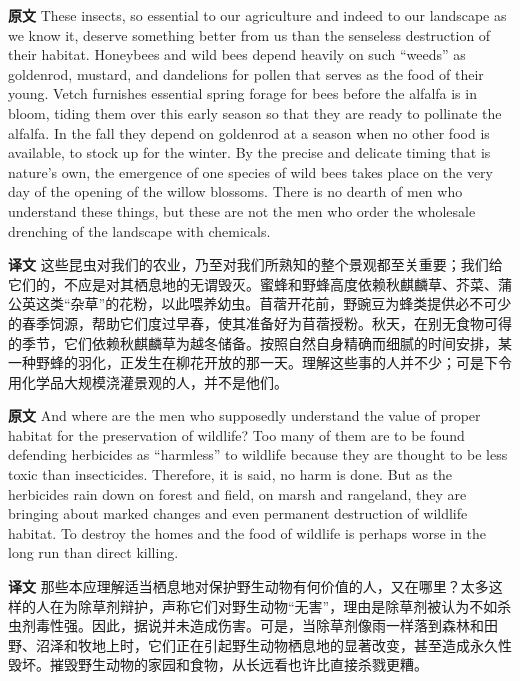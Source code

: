 \documentclass[UTF8,zihao=-4]{ctexart}
\begin{document}
\noindent\textbf{原文} These insects, so essential to our agriculture and indeed to our landscape as we know it, deserve something better from us than the senseless destruction of their habitat. Honeybees and wild bees depend heavily on such ``weeds'' as goldenrod, mustard, and dandelions for pollen that serves as the food of their young. Vetch furnishes essential spring forage for bees before the alfalfa is in bloom, tiding them over this early season so that they are ready to pollinate the alfalfa. In the fall they depend on goldenrod at a season when no other food is available, to stock up for the winter. By the precise and delicate timing that is nature's own, the emergence of one species of wild bees takes place on the very day of the opening of the willow blossoms. There is no dearth of men who understand these things, but these are not the men who order the wholesale drenching of the landscape with chemicals.
\par
\noindent\textbf{译文} 这些昆虫对我们的农业，乃至对我们所熟知的整个景观都至关重要；我们给它们的，不应是对其栖息地的无谓毁灭。蜜蜂和野蜂高度依赖秋麒麟草、芥菜、蒲公英这类“杂草”的花粉，以此喂养幼虫。苜蓿开花前，野豌豆为蜂类提供必不可少的春季饲源，帮助它们度过早春，使其准备好为苜蓿授粉。秋天，在别无食物可得的季节，它们依赖秋麒麟草为越冬储备。按照自然自身精确而细腻的时间安排，某一种野蜂的羽化，正发生在柳花开放的那一天。理解这些事的人并不少；可是下令用化学品大规模浇灌景观的人，并不是他们。
\par\medskip

\noindent\textbf{原文} And where are the men who supposedly understand the value of proper habitat for the preservation of wildlife? Too many of them are to be found defending herbicides as ``harmless'' to wildlife because they are thought to be less toxic than insecticides. Therefore, it is said, no harm is done. But as the herbicides rain down on forest and field, on marsh and rangeland, they are bringing about marked changes and even permanent destruction of wildlife habitat. To destroy the homes and the food of wildlife is perhaps worse in the long run than direct killing.
\par
\noindent\textbf{译文} 那些本应理解适当栖息地对保护野生动物有何价值的人，又在哪里？太多这样的人在为除草剂辩护，声称它们对野生动物“无害”，理由是除草剂被认为不如杀虫剂毒性强。因此，据说并未造成伤害。可是，当除草剂像雨一样落到森林和田野、沼泽和牧地上时，它们正在引起野生动物栖息地的显著改变，甚至造成永久性毁坏。摧毁野生动物的家园和食物，从长远看也许比直接杀戮更糟。
\par\medskip
\end{document}
